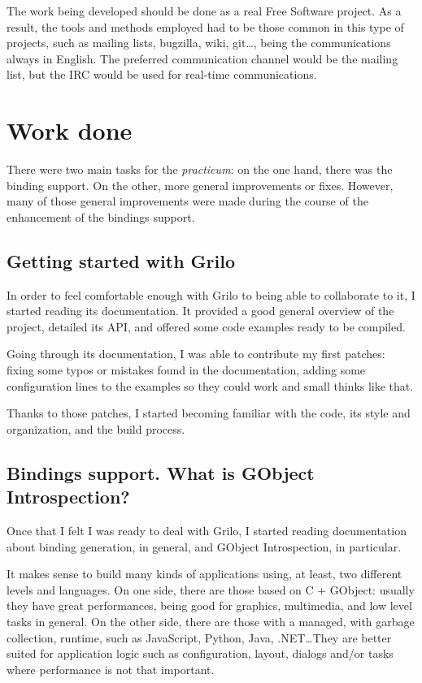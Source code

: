The work being developed should be done as a real Free Software project. As a result,
the tools and methods employed had to be those common in this type of projects,
such as mailing lists, bugzilla, wiki, git\dots, being the communications always in English. The
preferred communication channel would be the mailing list, but the IRC would be used for real-time communications.

\section{Work done}

There were two main tasks for the {\it practicum}: on the one hand, there was the
binding support. On the other, more general improvements or fixes. However, many
of those general improvements were made during the course of the enhancement of
the bindings support.

\subsection{Getting started with Grilo}

In order to feel comfortable enough with Grilo to being able to collaborate to it,
I started reading its documentation. It provided a good general overview of the project,
detailed its API, and offered some code examples ready to be compiled.

Going through its documentation, I was able to contribute my first patches: fixing
some typos or mistakes found in the documentation, adding some configuration lines
to the examples so they could work and small thinks like that.

Thanks to those patches, I started becoming familiar with the code, its style and
organization, and the build process.

\subsection{Bindings support. What is GObject Introspection?}

Once that I felt I was ready to deal with Grilo, I started reading documentation
about binding generation, in general, and GObject Introspection, in particular.

It makes sense to build many kinds of applications using, at least, two different
levels and languages. On one side, there are those based on C + GObject: usually
they have great performances, being good for graphics, multimedia, and low level tasks
in general. On the other side, there are those with a managed, with
garbage collection, runtime, such as JavaScript, Python, Java, .NET\dots They are
better suited for application logic such as configuration, layout, dialogs and/or
tasks where performance is not that important.


